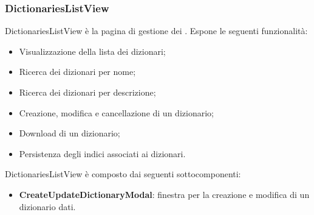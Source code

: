 \subsubsection{DictionariesListView}

\par DictionariesListView è la pagina di gestione  dei . Espone le seguenti funzionalità:
\begin{itemize}
  \item Visualizzazione della lista dei dizionari;
  \item Ricerca dei dizionari per nome;
  \item Ricerca dei dizionari per descrizione;
  \item Creazione, modifica e cancellazione di un dizionario;
  \item Download di un dizionario;
  \item Persistenza degli indici associati ai dizionari.
\end{itemize}

\par DictionariesListView è composto dai seguenti sottocomponenti:
\begin{itemize}
  \item \textbf{CreateUpdateDictionaryModal}: finestra per la creazione e modifica di un dizionario dati.
\end{itemize}

